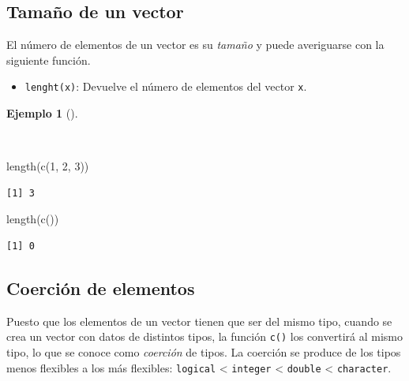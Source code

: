 \documentclass[
  spanish,
  a4paper,
]{scrreport}
\newenvironment{Shaded}{\begin{snugshade}}{\end{snugshade}}
\newcommand{\DecValTok}[1]{\textcolor[rgb]{0.68,0.00,0.00}{#1}}
\newcommand{\FunctionTok}[1]{\textcolor[rgb]{0.28,0.35,0.67}{#1}}
\newcommand{\NormalTok}[1]{\textcolor[rgb]{0.00,0.23,0.31}{#1}}
\providecommand{\tightlist}{%
  \setlength{\itemsep}{0pt}\setlength{\parskip}{0pt}}
\theoremstyle{definition}
\theoremstyle{definition}
\newtheorem{example}{Ejemplo}[chapter]
\theoremstyle{remark}
\begin{document}
\subsection{Tamaño de un vector}\label{tamauxf1o-de-un-vector}

El número de elementos de un vector es su \emph{tamaño} y puede
averiguarse con la siguiente función.

\begin{itemize}
\tightlist
\item
  \texttt{lenght(x)}: Devuelve el número de elementos del vector
  \texttt{x}.
\end{itemize}

\begin{example}[]\protect\hypertarget{exm-tamaño-vector}{}\label{exm-tamaño-vector}

~

\begin{Shaded}
\begin{Highlighting}[]
\FunctionTok{length}\NormalTok{(}\FunctionTok{c}\NormalTok{(}\DecValTok{1}\NormalTok{, }\DecValTok{2}\NormalTok{, }\DecValTok{3}\NormalTok{))}
\end{Highlighting}
\end{Shaded}

\begin{verbatim}
[1] 3
\end{verbatim}

\begin{Shaded}
\begin{Highlighting}[]
\FunctionTok{length}\NormalTok{(}\FunctionTok{c}\NormalTok{())}
\end{Highlighting}
\end{Shaded}

\begin{verbatim}
[1] 0
\end{verbatim}

\end{example}

\subsection{Coerción de elementos}\label{coerciuxf3n-de-elementos}

Puesto que los elementos de un vector tienen que ser del mismo tipo,
cuando se crea un vector con datos de distintos tipos, la función
\texttt{c()} los convertirá al mismo tipo, lo que se conoce como
\emph{coerción} de tipos. La coerción se produce de los tipos menos
flexibles a los más flexibles: \texttt{logical} \textless{}
\texttt{integer} \textless{} \texttt{double} \textless{}
\texttt{character}.
\end{document}
